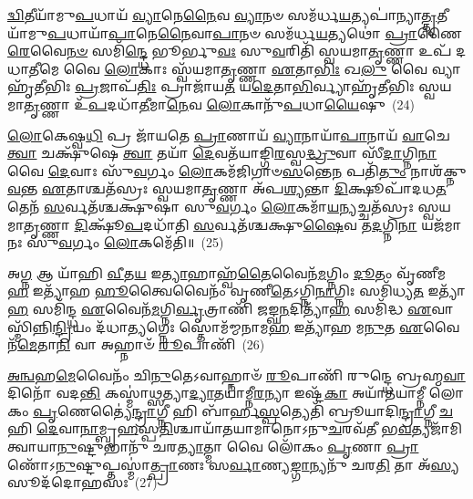 \-\ul{𑌦𑍍𑌵𑌿}\-𑌤𑍀𑌯𑌾᳴𑌮𑍁\-\ul{𑌪}\-𑌧𑌾𑌯᳴ \ul{𑌵𑍍𑌯𑌾}\-𑌨𑍇\-\ul{𑌨𑍈}\-𑌵 \ul{𑌵𑍍𑌯𑌾}\-𑌨𑍞 𑌸𑌮᳴𑌰𑍍𑌧\-\ul{𑌯}\-𑌤𑍍𑌯𑌪𑌾॑𑌨𑍍𑌯𑌾\-\ul{𑌤𑍍𑌤𑍃}\-𑌤𑍀𑌯𑌾᳴𑌮𑍁\-\ul{𑌪}\-𑌧𑌾𑌯𑌾᳴\-\ul{𑌪𑌾}\-𑌨𑍇\-\ul{𑌨𑍈}\-𑌵𑌾\-\ul{𑌪𑌾}\-𑌨𑍞 𑌸𑌮᳴𑌰𑍍𑌧\-\ul{𑌯}\-𑌤𑍍𑌯𑌥𑍋॑ \ul{𑌪𑍍𑌰𑌾}\-𑌣𑍈\-\ul{𑌰𑍇}\-𑌵𑍈\-\ul{𑌨}\-\-\ul{𑍞} 𑌸𑌮𑌿᳴\-\ul{𑌨𑍍𑌦𑍍𑌧𑍇} 𑌭𑍂𑌰𑍍𑌭𑍁\-\ul{𑌵𑌃} 𑌸𑍁\-\ul{𑌵}\-𑌰𑌿𑌤𑌿᳴ 𑌸𑍍𑌵𑌯𑌮𑌾\-\ul{𑌤𑍃}\-𑌣𑍍𑌣𑌾 𑌉𑌪᳴ 𑌦𑌧𑌾\-\ul{𑌤𑍀}\-𑌮𑍇 𑌵𑍈 \ul{𑌲𑍋}\-𑌕𑌾𑌃 𑌸𑍍𑌵᳴𑌯𑌮𑌾\-\ul{𑌤𑍃}\-𑌣𑍍𑌣𑌾 \ul{𑌏}\-𑌤𑌾\-\ul{𑌭𑌿𑌃} 𑌖\-\ul{𑌲𑍁} 𑌵𑍈 𑌵𑍍𑌯𑌾𑌹𑍃᳴𑌤𑍀𑌭𑌿𑌃 \ul{𑌪𑍍𑌰}\-𑌜𑌾𑌪᳴\-\ul{𑌤𑌿𑌃} 𑌪𑍍𑌰𑌾𑌜𑌾᳴𑌯\-\ul{𑌤} 𑌯\-\ul{𑌦𑍇}\-𑌤𑌾\-\ul{𑌭𑌿}\-𑌰𑍍𑌵𑍍𑌯𑌾𑌹𑍃᳴𑌤𑍀𑌭𑌿𑌃 𑌸𑍍𑌵𑌯𑌮𑌾\-\ul{𑌤𑍃}\-𑌣𑍍𑌣𑌾 𑌉᳴\-\ul{𑌪}\-𑌦𑌧𑌾᳴\-\ul{𑌤𑍀}\-𑌮𑌾\-\ul{𑌨𑍇}\-𑌵 \ul{𑌲𑍋}\-𑌕𑌾𑌨𑍁᳴\-\ul{𑌪}\-𑌧𑌾\-\ul{𑌯𑍈}\-𑌷𑍁~(24)

\-\ul{𑌲𑍋}\-𑌕𑍇𑌷𑍍𑌵\-\ul{𑌧𑌿} 𑌪𑍍𑌰 𑌜𑌾᳴𑌯𑌤𑍇 \ul{𑌪𑍍𑌰𑌾}\-𑌣𑌾𑌯᳴ \ul{𑌵𑍍𑌯𑌾}\-𑌨𑌾𑌯𑌾᳴\-\ul{𑌪𑌾}\-𑌨𑌾𑌯᳴ \ul{𑌵𑌾}\-𑌚𑍇 \ul{𑌤𑍍𑌵𑌾} 𑌚𑌕𑍍𑌷𑍁᳴𑌷𑍇 \ul{𑌤𑍍𑌵𑌾} 𑌤𑌯𑌾᳴ \ul{𑌦𑍇}\-𑌵𑌤᳴𑌯𑌾𑌙𑍍𑌗𑌿\-\ul{𑌰}\-𑌸𑍍𑌵\-\ul{𑌦𑍍𑌧𑍍𑌰𑍁}\-𑌵𑌾 𑌸𑍀᳴\-\ul{𑌦𑌾}\-𑌗𑍍𑌨𑌿\-\ul{𑌨𑌾} 𑌵𑍈 \ul{𑌦𑍇}\-𑌵𑌾𑌃 𑌸𑍁᳴\-\ul{𑌵}\-𑌰𑍍𑌗𑌂 \ul{𑌲𑍋}\-𑌕𑌮᳴𑌜𑌿𑌗𑌾𑍞\-\ul{𑌸}\-𑌨𑍍𑌤𑍇\-\ul{𑌨} 𑌪𑌤𑌿᳴\-\ul{𑌤𑍁𑌂} 𑌨𑌾𑌶᳴𑌕𑍍𑌨𑍁\-\ul{𑌵}\-𑌨𑍍𑌤 \ul{𑌏}\-𑌤𑌾𑌶𑍍𑌚𑌤᳴𑌸𑍍𑌰𑌃 𑌸𑍍𑌵𑌯𑌮𑌾\-\ul{𑌤𑍃}\-𑌣𑍍𑌣𑌾 𑌅᳴𑌪\-\ul{𑌶𑍍𑌯}\-𑌨𑍍𑌤𑌾 \ul{𑌦𑌿}\-𑌕𑍍𑌷𑍂𑌪𑌾᳴𑌦𑌧\-\ul{𑌤} 𑌤𑍇𑌨᳴ \ul{𑌸}\-𑌰𑍍𑌵𑌤᳴𑌶𑍍𑌚𑌕𑍍𑌷𑍁𑌷𑌾 𑌸𑍁\-\ul{𑌵}\-𑌰𑍍𑌗𑌂 \ul{𑌲𑍋}\-𑌕𑌮𑌾᳴\-\ul{𑌯}\-\-\ul{𑌨𑍍}\-𑌯𑌚𑍍𑌚𑌤᳴𑌸𑍍𑌰𑌃 𑌸𑍍𑌵𑌯𑌮𑌾\-\ul{𑌤𑍃}\-𑌣𑍍𑌣𑌾 \ul{𑌦𑌿}\-𑌕𑍍𑌷𑍂᳴\-\ul{𑌪}\-𑌦𑌧𑌾᳴𑌤𑌿 \ul{𑌸}\-𑌰𑍍𑌵𑌤᳴𑌶𑍍𑌚𑌕𑍍𑌷𑍁\-\ul{𑌷𑍈}\-𑌵 𑌤\-\ul{𑌦}\-𑌗𑍍𑌨𑌿\-\ul{𑌨𑌾} 𑌯𑌜᳴𑌮𑌾𑌨𑌃 𑌸𑍁\-\ul{𑌵}\-𑌰𑍍𑌗𑌂 \ul{𑌲𑍋}\-𑌕𑌮𑍇᳴𑌤𑌿॥~(25)

{\anuvakamend[{\-\ul{𑌬𑍍𑌰}\-\-\ul{𑌹𑍍𑌮}\-\-\ul{𑌵𑌾}\-𑌦𑌿\-\ul{𑌨𑍋} 𑌵𑍍𑌯᳴𑌨𑍍𑌯𑌾\-\ul{𑌦𑍇}\-𑌷𑍁 𑌯𑌜᳴𑌮𑌾\-\ul{𑌨}\-𑌸𑍍𑌤𑍍𑌰𑍀𑌣𑌿᳴ 𑌚}]}%

𑌅\-\ul{𑌗𑍍𑌨} 𑌆 𑌯𑌾᳴𑌹𑌿 \ul{𑌵𑍀}\-𑌤\-\ul{𑌯} 𑌇\-\ul{𑌤𑍍𑌯𑌾}\-𑌹𑌾𑌹𑍍𑌵᳴\-\ul{𑌤𑍈}\-𑌵𑍈𑌨᳴\-\ul{𑌮}\-𑌗𑍍𑌨𑌿𑌂 \ul{𑌦𑍂}\-𑌤𑌂 𑌵𑍃᳴𑌣𑍀𑌮\-\ul{𑌹} 𑌇𑌤𑍍𑌯𑌾᳴𑌹 \ul{𑌹𑍂}\-𑌤𑍍𑌵𑍈𑌵𑍈𑌨𑌂᳴ 𑌵𑍃𑌣𑍀\-\ul{𑌤𑍇}\-\-𑌽𑌗𑍍𑌨𑌿\-\ul{𑌨𑌾}\-𑌗𑍍𑌨𑌿𑌃 𑌸𑌮𑌿᳴𑌧𑍍𑌯\-\ul{𑌤} 𑌇𑌤𑍍𑌯𑌾᳴\-\ul{𑌹} 𑌸𑌮𑌿᳴𑌨𑍍𑌦𑍍𑌧 \ul{𑌏}\-𑌵𑍈𑌨᳴\-\ul{𑌮}\-𑌗𑍍𑌨𑌿\-\ul{𑌰𑍍𑌵𑍃}\-𑌤𑍍𑌰𑌾𑌣𑌿᳴ 𑌜𑌙𑍍𑌘\-\ul{𑌨}\-𑌦𑌿𑌤𑍍𑌯𑌾᳴\-\ul{𑌹} 𑌸𑌮𑌿᳴𑌦𑍍𑌧 \ul{𑌏}\-𑌵𑌾𑌸𑍍𑌮𑌿᳴𑌨𑍍𑌨𑌿\-\ul{𑌨𑍍𑌦𑍍𑌰𑌿}\-𑌯𑌂 𑌦᳴𑌧𑌾\-\ul{𑌤𑍍𑌯}\-𑌗𑍍𑌨𑍇𑌃 𑌸𑍍𑌤𑍋𑌮᳴𑌮𑍍𑌮𑌨𑌾𑌮\-\ul{𑌹} 𑌇𑌤𑍍𑌯𑌾᳴𑌹 𑌮\-\ul{𑌨𑍁}\-𑌤 \ul{𑌏}\-𑌵𑍈𑌨᳴\-\ul{𑌮𑍇}\-𑌤𑌾\-\ul{𑌨𑌿} 𑌵𑌾 𑌅𑌹𑍍𑌨𑌾𑍞᳴ \ul{𑌰𑍂}\-𑌪𑌾𑌣𑌿᳴~(26)

\-\ul{𑌅}\-\-\ul{𑌨𑍍𑌵}\-𑌹\-\ul{𑌮𑍇}\-𑌵𑍈𑌨𑌂᳴ 𑌚𑌿\-\ul{𑌨𑍁}\-𑌤𑍇\-𑌽𑌵𑌾𑌹𑍍𑌨𑌾𑍞᳴ \ul{𑌰𑍂}\-𑌪𑌾𑌣𑌿᳴ 𑌰𑍁𑌨𑍍𑌦𑍍𑌧𑍇 𑌬𑍍𑌰𑌹𑍍𑌮\-\ul{𑌵𑌾}\-𑌦𑌿𑌨𑍋᳴ 𑌵𑌦\-\ul{𑌨𑍍𑌤𑌿} 𑌕𑌸𑍍𑌮𑌾॑\-\ul{𑌥𑍍𑌸}\-𑌤𑍍𑌯𑌾\-\ul{𑌦𑍍𑌯𑌾}\-𑌤𑌯𑌾॑𑌮𑍍𑌨𑍀\-\ul{𑌰}\-𑌨𑍍𑌯𑌾 𑌇𑌷𑍍𑌟᳴\-\ul{𑌕𑌾} 𑌅𑌯𑌾᳴𑌤𑌯𑌾𑌮𑍍𑌨𑍀 𑌲𑍋𑌕𑌂 \ul{𑌪𑍃}\-𑌣𑍇𑌤𑍍𑌯𑍈॑\-\ul{𑌨𑍍𑌦𑍍𑌰𑌾}\-𑌗𑍍𑌨𑍀 𑌹𑌿 𑌬𑌾᳴𑌰𑍍\mbox{}𑌹\-\ul{𑌸𑍍𑌪}\-𑌤𑍍𑌯𑍇𑌤𑌿᳴ 𑌬𑍍𑌰𑍂𑌯𑌾𑌦𑌿\-\ul{𑌨𑍍𑌦𑍍𑌰𑌾}\-𑌗𑍍𑌨𑍀 \ul{𑌚} 𑌹𑌿 \ul{𑌦𑍇}\-𑌵𑌾\-\ul{𑌨𑌾}\-𑌮𑍍𑌬𑍃\-\ul{𑌹}\-𑌸𑍍𑌪\-\ul{𑌤𑌿}\-𑌶𑍍𑌚𑌾𑌯𑌾᳴𑌤𑌯𑌾𑌮𑌾𑌨𑍋\-𑌽𑌨𑍁\-\ul{𑌚}\-𑌰𑌵᳴𑌤𑍀 𑌭\-\ul{𑌵}\-𑌤𑍍𑌯𑌜𑌾᳴𑌮𑌿𑌤𑍍𑌵𑌾𑌯𑌾\-\ul{𑌨𑍁}\-𑌷𑍍𑌟𑍁𑌭𑌾𑌨𑍁᳴ 𑌚𑌰\-\ul{𑌤𑍍𑌯𑌾}\-𑌤𑍍𑌮𑌾 𑌵𑍈 𑌲𑍋᳴𑌕𑌂 \ul{𑌪𑍃}\-𑌣𑌾 \ul{𑌪𑍍𑌰𑌾}\-𑌣𑍋᳴\-𑌽\-\ul{𑌨𑍁}\-𑌷𑍍𑌟𑍁𑌪𑍍𑌤𑌸𑍍𑌮𑌾॑\-\ul{𑌤𑍍𑌪𑍍𑌰𑌾}\-𑌣𑌃 𑌸\-\ul{𑌰𑍍𑌵𑌾}\-𑌣𑍍𑌯\-\ul{𑌙𑍍𑌗𑌾}\-𑌨𑍍𑌯𑌨𑍁᳴ 𑌚𑌰\-\ul{𑌤𑌿} 𑌤𑌾 𑌅᳴\-\ul{𑌸𑍍𑌯} 𑌸𑍂𑌦᳴𑌦𑍋𑌹𑌸𑌃~(27)

